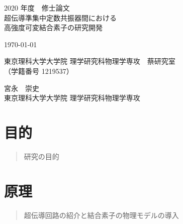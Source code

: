 \documentclass[uplatex,openany,oneside,a4j,11pt]{jsbook}
\begin{document}
\begin{titlepage}
    \begin{center}
        {\Large 2020 年度　修士論文}\\
        \vspace{180truept}
        {\Huge 超伝導準集中定数共振器間における\\
        \vspace{10truept}
        高強度可変結合素子の研究開発}\\ 
        \vspace{70truept}

        {\Large \today}\\

        \vspace{70truept}

        {\Large 東京理科大学大学院 理学研究科物理学専攻　蔡研究室\\
        （学籍番号 1219537）}\\

        \vspace{20truept}

        {\huge 宮永　崇史}\\

        \vspace{160truept}
        {\Large 東京理科大学大学院 理学研究科物理学専攻}\\
    \end{center}
\end{titlepage}
{}


\setcounter{tocdepth}{2}
\tableofcontents

\chapter{目的}
    \begin{abstract}
        研究の目的
    \end{abstract}
    

\chapter{原理}
    \begin{abstract}
        超伝導回路の紹介と結合素子の物理モデルの導入
    \end{abstract}
    
\end{document}
